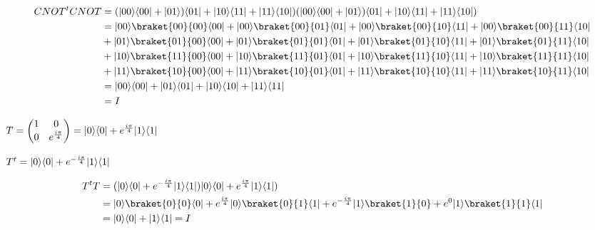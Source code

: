 \documentclass[osajnl,preprint,showpacs,superscriptaddress,10pt]{revtex4-1} %
\DeclarePairedDelimiter\bra{\langle}{\rvert}
\DeclarePairedDelimiter\ket{\lvert}{\rangle}
\begin{document}
\begin{fleqn}[\parindent]
\begin{equation}
\begin{split}
    CNOT^t CNOT
        &= (\ket{00} \bra{00} + \ket{01}) \bra{01} + \ket{10} \bra{11} + \ket{11} \bra{10}) (\ket{00} \bra{00} + \ket{01}) \bra{01} + \ket{10} \bra{11} + \ket{11} \bra{10}) \\
        &= \ket{00}\braket{00}{00}\bra{00} + \ket{00}\braket{00}{01}\bra{01} + \ket{00}\braket{00}{10}\bra{11} + \ket{00}\braket{00}{11}\bra{10} \\
        &+ \ket{01}\braket{01}{00}\bra{00} + \ket{01}\braket{01}{01}\bra{01} + \ket{01}\braket{01}{10}\bra{11} + \ket{01}\braket{01}{11}\bra{10} \\
        &+  \ket{10}\braket{11}{00}\bra{00} + \ket{10}\braket{11}{01}\bra{01} + \ket{10}\braket{11}{10}\bra{11} + \ket{10}\braket{11}{11}\bra{10} \\
        &+ \ket{11}\braket{10}{00}\bra{00} + \ket{11}\braket{10}{01}\bra{01} + \ket{11}\braket{10}{10}\bra{11} + \ket{11}\braket{10}{11}\bra{10} \\
        &= \ket{00} \bra{00} + \ket{01}\bra{01} + \ket{10} \bra{10} + \ket{11} \bra{11} \\
        &= I
\end{split}
\end{equation}
\end{fleqn}


$T = \begin{pmatrix}1 & 0 \\ 0 & e^{\frac{i \pi}{4}}\end{pmatrix} = \ket{0} \bra{0} + e^{\frac{i \pi}{4}} \ket{1} \bra{1}$

$T^t = \ket{0} \bra{0} + e^{-\frac{i \pi}{4}} \ket{1} \bra{1}$


\begin{fleqn}[\parindent]
\begin{equation}
\begin{split}
    T^t T 
        &= (\ket{0} \bra{0} + e^{-\frac{i \pi}{4}} \ket{1} \bra{1}) \ket{0} \bra{0} + e^{\frac{i \pi}{4}} \ket{1} \bra{1}) \\
        &= \ket{0} \braket{0}{0} \bra{0} + e^{\frac{i \pi}{4}} \ket{0} \braket{0}{1} \bra{1} + e^{-\frac{i \pi}{4}} \ket{1} \braket{1}{0} + e^0 \ket{1} \braket{1}{1} \bra{1} \\
        &= \ket{0} \bra{0} + \ket{1} \bra{1} = I
\end{split}
\end{equation}
\end{fleqn}
\end{document}
